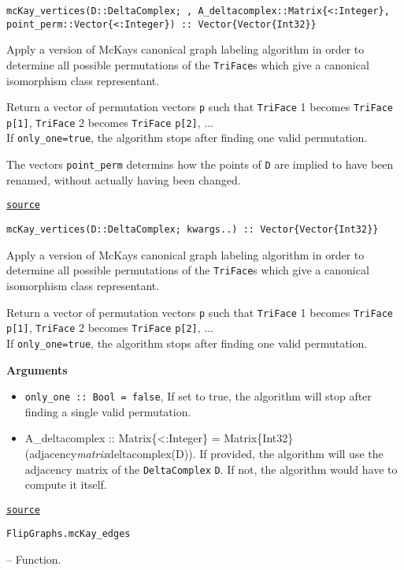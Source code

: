 \begin{adjustwidth}{2em}{0pt}


\begin{verbatim}
mcKay_vertices(D::DeltaComplex; , A_deltacomplex::Matrix{<:Integer}, point_perm::Vector{<:Integer}) :: Vector{Vector{Int32}}
\end{verbatim}

Apply a version of McKay{\textquotesingle}s canonical graph labeling algorithm in order to determine all possible permutations  of the \texttt{TriFace}s which give a canonical isomorphism class representant.

Return a vector of permutation vectors \texttt{p} such that \texttt{TriFace} 1 becomes \texttt{TriFace} \texttt{p[1]}, \texttt{TriFace} 2 becomes \texttt{TriFace} \texttt{p[2]}, ...\\
If \texttt{only\_one=true}, the algorithm stops after finding one valid permutation.

The vectors \texttt{point\_perm} determins how the points of \texttt{D} are implied to have been renamed, without actually having been changed.



\href{https://github.com/schto223/FlipGraphs.jl/blob/490c01a7adf74b42f27dda05099165c47ae8133e/src/flipGraph.jl#L773-L783}{\texttt{source}}



\begin{verbatim}
mcKay_vertices(D::DeltaComplex; kwargs..) :: Vector{Vector{Int32}}
\end{verbatim}

Apply a version of McKay{\textquotesingle}s canonical graph labeling algorithm in order to determine all possible permutations  of the \texttt{TriFace}s which give a canonical isomorphism class representant.

Return a vector of permutation vectors \texttt{p} such that \texttt{TriFace} 1 becomes \texttt{TriFace} \texttt{p[1]}, \texttt{TriFace} 2 becomes \texttt{TriFace} \texttt{p[2]}, ...\\
If \texttt{only\_one=true}, the algorithm stops after finding one valid permutation.

\textbf{Arguments}

\begin{itemize}
\item \texttt{only\_one :: Bool = false}, If set to true, the algorithm will stop after finding a single valid permutation.


\item A\_deltacomplex :: Matrix\{<:Integer\} = Matrix\{Int32\}(adjacency\emph{matrix}deltacomplex(D)). If provided, the algorithm will use the adjacency matrix of the \texttt{DeltaComplex} \texttt{D}. If not, the algorithm would have to compute it itself.

\end{itemize}


\href{https://github.com/schto223/FlipGraphs.jl/blob/490c01a7adf74b42f27dda05099165c47ae8133e/src/flipGraph.jl#L805-L817}{\texttt{source}}


\end{adjustwidth}
\hypertarget{16516759205726853869}{\texttt{FlipGraphs.mcKay\_edges}}  -- {Function.}

